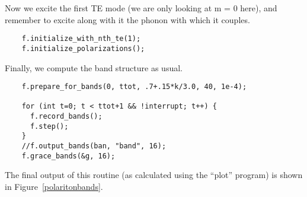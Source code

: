 Now we excite the first TE mode (we are only looking at m = 0 here), and
remember to excite along with it the phonon with which it couples.

\begin{verbatim}
    f.initialize_with_nth_te(1);
    f.initialize_polarizations();
\end{verbatim}

Finally, we compute the band structure as usual.

\begin{verbatim}
    f.prepare_for_bands(0, ttot, .7+.15*k/3.0, 40, 1e-4);
    
    for (int t=0; t < ttot+1 && !interrupt; t++) {
      f.record_bands();
      f.step();
    }
    //f.output_bands(ban, "band", 16);
    f.grace_bands(&g, 16);
\end{verbatim}
\begin{comment}
    //fflush(ban);
  }
  //fclose(ban);
}
\end{comment}

The final output of this routine (as calculated using the ``plot'' program)
is shown in Figure~\ref{polaritonbands}.
